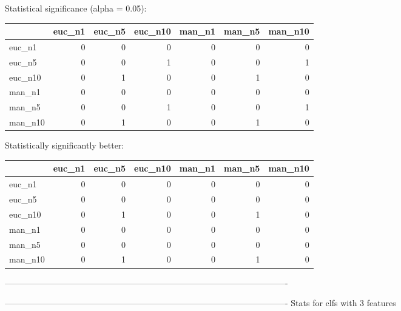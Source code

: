Statistical significance (alpha = 0.05):
 \begin{tabular}{lrrrrrr}
\hline
         &   euc\_n1 &   euc\_n5 &   euc\_n10 &   man\_n1 &   man\_n5 &   man\_n10 \\
\hline
 euc\_n1  &        0 &        0 &         0 &        0 &        0 &         0 \\
 euc\_n5  &        0 &        0 &         1 &        0 &        0 &         1 \\
 euc\_n10 &        0 &        1 &         0 &        0 &        1 &         0 \\
 man\_n1  &        0 &        0 &         0 &        0 &        0 &         0 \\
 man\_n5  &        0 &        0 &         1 &        0 &        0 &         1 \\
 man\_n10 &        0 &        1 &         0 &        0 &        1 &         0 \\
\hline
\end{tabular} 

Statistically significantly better:
 \begin{tabular}{lrrrrrr}
\hline
         &   euc\_n1 &   euc\_n5 &   euc\_n10 &   man\_n1 &   man\_n5 &   man\_n10 \\
\hline
 euc\_n1  &        0 &        0 &         0 &        0 &        0 &         0 \\
 euc\_n5  &        0 &        0 &         0 &        0 &        0 &         0 \\
 euc\_n10 &        0 &        1 &         0 &        0 &        1 &         0 \\
 man\_n1  &        0 &        0 &         0 &        0 &        0 &         0 \\
 man\_n5  &        0 &        0 &         0 &        0 &        0 &         0 \\
 man\_n10 &        0 &        1 &         0 &        0 &        1 &         0 \\
\hline
\end{tabular} 

----------------------------------------------------------------------------------------------------



----------------------------------------------------------------------------------------------------
Stats for clfs with 3 features


